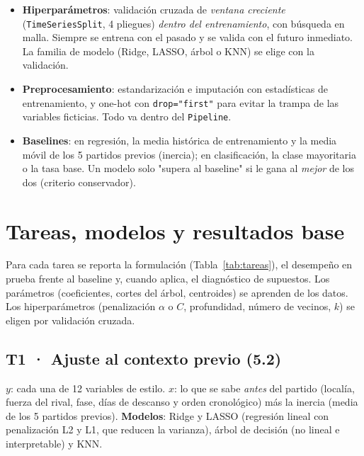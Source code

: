 \documentclass[11pt,a4paper]{article}
\begin{document}


\begin{itemize}
  \item \textbf{Hiperparámetros}: validación cruzada de \emph{ventana creciente} (\texttt{TimeSeriesSplit}, 4 pliegues)
        \emph{dentro del entrenamiento}, con búsqueda en malla. Siempre se entrena con el pasado y se valida con el
        futuro inmediato. La familia de modelo (Ridge, LASSO, árbol o KNN) se elige con la validación.
  \item \textbf{Preprocesamiento}: estandarización e imputación con estadísticas de entrenamiento, y one-hot con
        \texttt{drop="first"} para evitar la trampa de las variables ficticias. Todo va dentro del \texttt{Pipeline}.
  \item \textbf{Baselines}: en regresión, la media histórica de entrenamiento y la media móvil de los 5 partidos previos
        (inercia); en clasificación, la clase mayoritaria o la tasa base. Un modelo solo "supera al baseline" si le gana
        al \emph{mejor} de los dos (criterio conservador).
\end{itemize}

\section{Tareas, modelos y resultados base}\label{sec:modelos}
Para cada tarea se reporta la formulación (Tabla~\ref{tab:tareas}), el desempeño en prueba frente al baseline y, cuando
aplica, el diagnóstico de supuestos. Los parámetros (coeficientes, cortes del árbol, centroides) se aprenden de los
datos. Los hiperparámetros (penalización $\alpha$ o $C$, profundidad, número de vecinos, $k$) se eligen por validación
cruzada.

\subsection{T1 · Ajuste al contexto previo (5.2)}
\textbf{$y$}: cada una de 12 variables de estilo. \textbf{$x$}: lo que se sabe \emph{antes} del partido (localía, fuerza
del rival, fase, días de descanso y orden cronológico) más la inercia (media de los 5 partidos previos). \textbf{Modelos}:
Ridge y LASSO (regresión lineal con penalización L2 y L1, que reducen la varianza), árbol de decisión (no lineal e
interpretable) y KNN.
\end{document}
